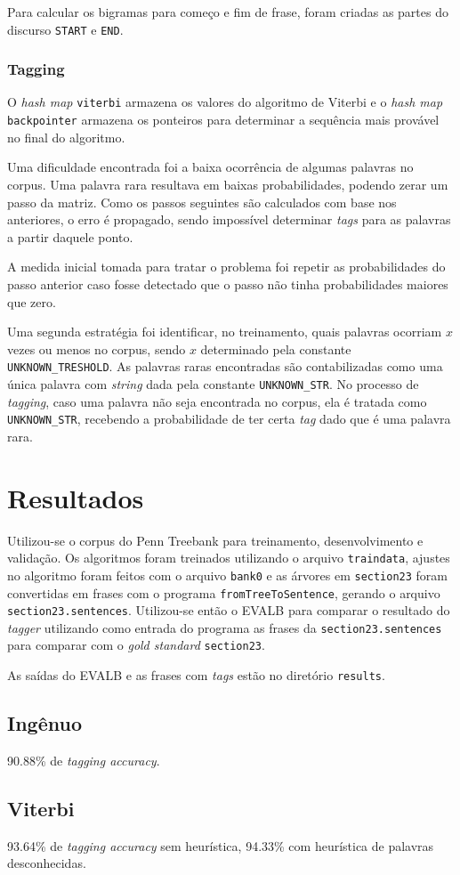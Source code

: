 \documentclass[12pt, a4paper]{article}
\newcommand{\code}[1]{{\lstinline{#1}}}
\begin{document}
Para calcular os bigramas para começo e fim de frase, foram criadas as partes do
discurso \code{START} e \code{END}.

\subsubsection{Tagging}
O \emph{hash map} \code{viterbi} armazena os valores do algoritmo de Viterbi e o
\emph{hash map} \code{backpointer} armazena os ponteiros para determinar a
sequência mais provável no final do algoritmo.

Uma dificuldade encontrada foi a baixa ocorrência de algumas palavras no
corpus. Uma palavra rara resultava em baixas probabilidades, podendo zerar um
passo da matriz. Como os passos seguintes são calculados com base nos
anteriores, o erro é propagado, sendo impossível determinar \emph{tags} para
as palavras a partir daquele ponto.

A medida inicial tomada para tratar o problema foi repetir as probabilidades do
passo anterior caso fosse detectado que o passo não tinha probabilidades maiores
que zero.

Uma segunda estratégia foi identificar, no treinamento, quais palavras ocorriam
$ x $ vezes ou menos no corpus, sendo $ x $ determinado pela constante
\code{UNKNOWN_TRESHOLD}. As palavras raras encontradas são contabilizadas como uma
única palavra com \emph{string} dada pela constante \code{UNKNOWN_STR}. No
processo de \emph{tagging}, caso uma palavra não seja encontrada no corpus, ela
é tratada como \code{UNKNOWN_STR}, recebendo a probabilidade de ter certa \emph{tag} dado que é uma palavra rara.

\section{Resultados}
Utilizou-se o corpus do Penn Treebank para treinamento, desenvolvimento e
validação. Os algoritmos foram treinados utilizando o arquivo \code{traindata},
ajustes no algoritmo foram feitos com o arquivo \code{bank0} e as árvores em \code{section23}
foram convertidas em frases com o programa \code{fromTreeToSentence}, gerando o
arquivo \code{section23.sentences}. Utilizou-se então o EVALB para comparar o
resultado do \emph{tagger} utilizando como entrada do programa as frases da
\code{section23.sentences} para comparar com o \emph{gold standard}
\code{section23}.

As saídas do EVALB e as frases com \emph{tags} estão no diretório \code{results}.

\subsection{Ingênuo}
90.88\% de \emph{tagging accuracy}.

\subsection{Viterbi}
93.64\% de \emph{tagging accuracy} sem heurística, 94.33\% com heurística de
palavras desconhecidas.
\end{document}
